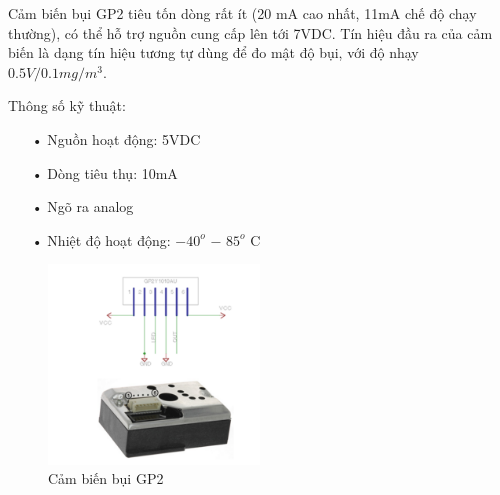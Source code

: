 Cảm biến bụi GP2 tiêu tốn dòng rất ít (20 mA cao nhất, 11mA chế độ chạy thường), có thể hỗ trợ nguồn cung cấp lên tới 7VDC. Tín hiệu đầu ra của cảm biến là dạng tín hiệu tương tự dùng để đo mật độ bụi, với độ nhạy $0.5V/0.1mg/{m}^{3}$.

Thông số kỹ thuật:
\begin{itemize}
\item[•]Nguồn hoạt động: 5VDC
\item[•]Dòng tiêu thụ: 10mA
\item[•]Ngõ ra analog
\item[•]Nhiệt độ hoạt động: $-40^{o}$ $-$ $85 ^{o}$ C
\end{itemize}

\begin{figure}[H]
	\centering    
	\includegraphics[width=0.5\textwidth]{gp2}
	\caption[Cảm biến bụi GP2 ]{Cảm biến bụi GP2}
	\label{fig:gp2}
\end{figure}

\newpage
